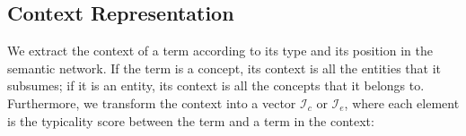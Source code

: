 \subsection{Context Representation}
\label{sec:context}

%
We extract the context of a term according to its type and its position in the
semantic network. If the term is a concept, its context is all the entities that it
subsumes; if it is an entity, its context is all the concepts that it belongs to.
Furthermore, we transform the context into a vector $\mathcal{I}_c$ or $\mathcal{I}_e$, where each element is the typicality score between the term and a term in the context:
